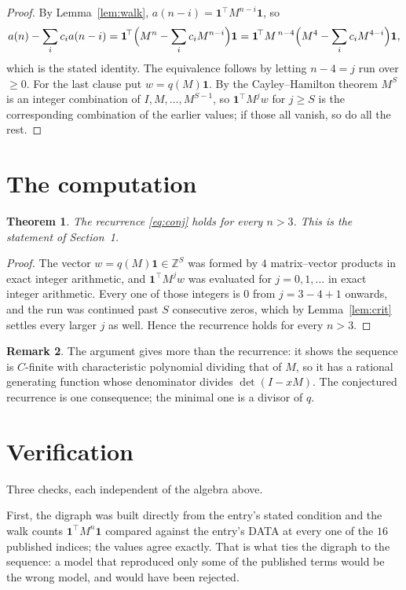 \documentclass[11pt,a4paper]{article}
\theoremstyle{plain}
\newtheorem{theorem}{Theorem}
\theoremstyle{definition}
\newtheorem{remark}[theorem]{Remark}
\begin{document}
\begin{proof}
By Lemma~\ref{lem:walk}, $a(n-i)=\mathbf{1}^{\!\top}M^{n-i}\mathbf{1}$, so
\[
a(n)-\sum_i c_i a(n-i)
=\mathbf{1}^{\!\top}\Bigl(M^{n}-\sum_i c_i M^{n-i}\Bigr)\mathbf{1}
=\mathbf{1}^{\!\top}M^{\,n-4}\Bigl(M^{4}-\sum_i c_i M^{4-i}\Bigr)\mathbf{1},
\]
which is the stated identity. The equivalence follows by letting $n-4=j$ run over
$\ge0$. For the last clause put $w=q(M)\mathbf{1}$. By the Cayley--Hamilton theorem
$M^{S}$ is an integer combination of $I,M,\dots,M^{S-1}$, so
$\mathbf{1}^{\!\top}M^{j}w$ for $j\ge S$ is the corresponding combination of the
earlier values; if those all vanish, so do all the rest.
\end{proof}

\section{The computation}

\begin{theorem}
The recurrence \eqref{eq:conj} holds for every $n>3$. This is the statement of
Section~1.
\end{theorem}

\begin{proof}
The vector $w=q(M)\mathbf{1}\in\mathbb{Z}^{S}$ was formed by $4$ matrix--vector
products in exact integer arithmetic, and $\mathbf{1}^{\!\top}M^{j}w$ was evaluated for
$j=0,1,\dots$ in exact integer arithmetic. Every one of those integers is $0$ from
$j=3-4+1$ onwards, and the run was continued past $S$ consecutive zeros, which by
Lemma~\ref{lem:crit} settles every larger $j$ as well. Hence the recurrence holds for
every $n>3$.
\end{proof}

\begin{remark}
The argument gives more than the recurrence: it shows the sequence is $C$-finite with
characteristic polynomial dividing that of $M$, so it has a rational generating function
whose denominator divides $\det(I-xM)$. The conjectured recurrence is one consequence; the
minimal one is a divisor of $q$.
\end{remark}

\section{Verification}

Three checks, each independent of the algebra above.

First, the digraph was built directly from the entry's stated condition and the walk counts
$\mathbf{1}^{\!\top}M^{n}\mathbf{1}$ compared against the entry's DATA at every one of
the $16$ published indices; the values agree exactly. That is what ties the digraph to
the sequence: a model that reproduced only some of the published terms would be the wrong
model, and would have been rejected.
\end{document}
